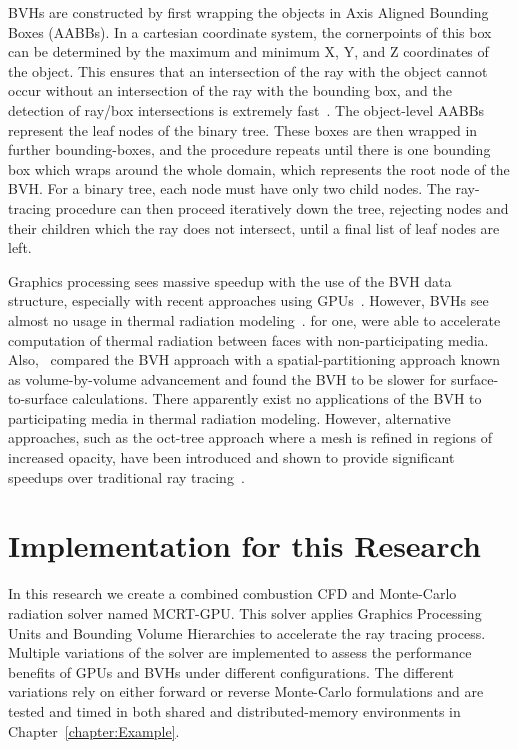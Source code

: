 BVHs are constructed by first wrapping the objects in Axis Aligned Bounding Boxes (AABBs). In a cartesian coordinate system, the cornerpoints of this box can be determined by the maximum and minimum X, Y, and Z coordinates of the object.
This ensures that an intersection of the ray with the object cannot occur without an intersection of the ray with the bounding box, and the detection of ray/box intersections is extremely fast~\cite{Kay1986RayScenes}.
The object-level AABBs represent the leaf nodes of the binary tree. These boxes are then wrapped in further bounding-boxes, and the procedure repeats until there is one bounding box which wraps around the whole domain, which represents the root node of the BVH. 
For a binary tree, each node must have only two child nodes. The ray-tracing procedure can then proceed iteratively down the tree, rejecting nodes and their children which the ray does not intersect, until a final list of leaf nodes are left.

Graphics processing sees massive speedup with the use of the BVH data structure, especially with recent approaches using GPUs~\cite{Nery2013ParallelGPGPUs,Meister2021ATracing,Karras2012MaximizingTrees}.
However, BVHs see almost no usage in thermal radiation modeling~\cite{Liu2020TheFlames}.
\citet{Kuczynskia2014RadiationBoundaries} for one, were able to accelerate computation of thermal radiation between faces with non-participating media. 
Also,~\citet{Mazumder2006MethodsTransport} compared the BVH approach with a spatial-partitioning approach known as volume-by-volume advancement and found the BVH to be slower for surface-to-surface calculations. 
There apparently exist no applications of the BVH to participating media in thermal radiation modeling. However, alternative approaches, such as the oct-tree approach where a mesh is refined in regions of increased opacity, have been introduced and shown to provide significant speedups over traditional ray tracing~\cite{Saftly2013UsingNote,Villefranque2019AAtmospheres}.

\section{Implementation for this Research} \label{section:ModelForThisStudy}
In this research we create a combined combustion CFD and Monte-Carlo radiation solver named MCRT-GPU. This solver applies Graphics Processing Units and Bounding Volume Hierarchies to accelerate the ray tracing process. 
Multiple variations of the solver are implemented to assess the performance benefits of GPUs and BVHs under different configurations.
The different variations rely on either forward or reverse Monte-Carlo formulations and are tested and timed in both shared and distributed-memory environments in Chapter~\ref{chapter:Example}.

